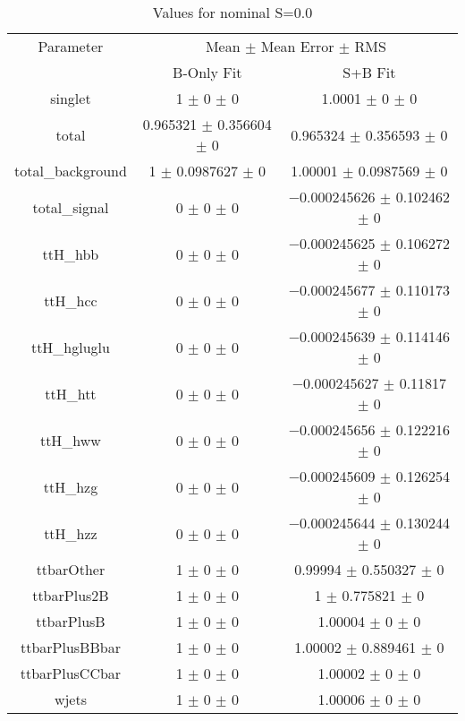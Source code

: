 \begin{table}
\centering
\caption{Values for nominal S=0.0}
\begin{tabular}{ccc}
\toprule
Parameter & \multicolumn{2}{c}{Mean $\pm$ Mean Error $\pm$ RMS}\\
 & B-Only Fit & S+B Fit\\
\midrule
singlet & \num{1} $\pm$ \num{0} $\pm$ \num{0} & \num{1.0001} $\pm$ \num{0} $\pm$ \num{0}\\
total & \num{0.965321} $\pm$ \num{0.356604} $\pm$ \num{0} & \num{0.965324} $\pm$ \num{0.356593} $\pm$ \num{0}\\
total\_background & \num{1} $\pm$ \num{0.0987627} $\pm$ \num{0} & \num{1.00001} $\pm$ \num{0.0987569} $\pm$ \num{0}\\
total\_signal & \num{0} $\pm$ \num{0} $\pm$ \num{0} & \num{-0.000245626} $\pm$ \num{0.102462} $\pm$ \num{0}\\
ttH\_hbb & \num{0} $\pm$ \num{0} $\pm$ \num{0} & \num{-0.000245625} $\pm$ \num{0.106272} $\pm$ \num{0}\\
ttH\_hcc & \num{0} $\pm$ \num{0} $\pm$ \num{0} & \num{-0.000245677} $\pm$ \num{0.110173} $\pm$ \num{0}\\
ttH\_hgluglu & \num{0} $\pm$ \num{0} $\pm$ \num{0} & \num{-0.000245639} $\pm$ \num{0.114146} $\pm$ \num{0}\\
ttH\_htt & \num{0} $\pm$ \num{0} $\pm$ \num{0} & \num{-0.000245627} $\pm$ \num{0.11817} $\pm$ \num{0}\\
ttH\_hww & \num{0} $\pm$ \num{0} $\pm$ \num{0} & \num{-0.000245656} $\pm$ \num{0.122216} $\pm$ \num{0}\\
ttH\_hzg & \num{0} $\pm$ \num{0} $\pm$ \num{0} & \num{-0.000245609} $\pm$ \num{0.126254} $\pm$ \num{0}\\
ttH\_hzz & \num{0} $\pm$ \num{0} $\pm$ \num{0} & \num{-0.000245644} $\pm$ \num{0.130244} $\pm$ \num{0}\\
ttbarOther & \num{1} $\pm$ \num{0} $\pm$ \num{0} & \num{0.99994} $\pm$ \num{0.550327} $\pm$ \num{0}\\
ttbarPlus2B & \num{1} $\pm$ \num{0} $\pm$ \num{0} & \num{1} $\pm$ \num{0.775821} $\pm$ \num{0}\\
ttbarPlusB & \num{1} $\pm$ \num{0} $\pm$ \num{0} & \num{1.00004} $\pm$ \num{0} $\pm$ \num{0}\\
ttbarPlusBBbar & \num{1} $\pm$ \num{0} $\pm$ \num{0} & \num{1.00002} $\pm$ \num{0.889461} $\pm$ \num{0}\\
ttbarPlusCCbar & \num{1} $\pm$ \num{0} $\pm$ \num{0} & \num{1.00002} $\pm$ \num{0} $\pm$ \num{0}\\
wjets & \num{1} $\pm$ \num{0} $\pm$ \num{0} & \num{1.00006} $\pm$ \num{0} $\pm$ \num{0}\\
\bottomrule
\end{tabular}
\end{table}